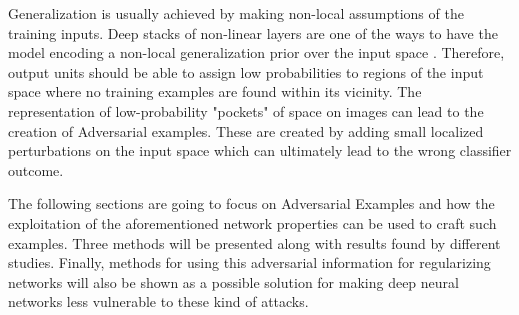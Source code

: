 Generalization is usually achieved by making non-local assumptions of the training inputs. Deep stacks of non-linear layers are one of the ways to have the model encoding a non-local generalization prior over the input space \cite{gu2014}. Therefore, output units should be able to assign low probabilities to regions of the input space where no training examples are found within its vicinity. The representation of low-probability "pockets" of space on images can lead to the creation of Adversarial examples. These are created by adding small localized perturbations on the input space which can ultimately lead to the wrong classifier outcome. 


The following sections are going to focus on Adversarial Examples and how the exploitation of the aforementioned network properties can be used to craft such examples. Three methods will be presented along with results found by different studies. Finally, methods for using this adversarial information for regularizing networks will also be shown as a possible solution for making deep neural networks less vulnerable to these kind of attacks.